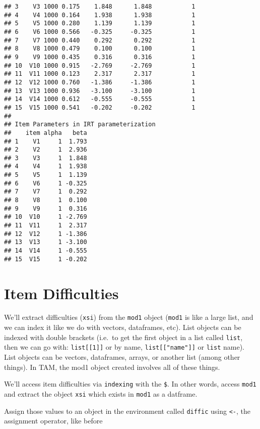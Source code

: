 \documentclass[
]{book}
\newenvironment{Shaded}{\begin{snugshade}}{\end{snugshade}}
\newcommand{\NormalTok}[1]{#1}
\newcommand{\OtherTok}[1]{\textcolor[rgb]{0.56,0.35,0.01}{#1}}
\newcommand{\SpecialCharTok}[1]{\textcolor[rgb]{0.00,0.00,0.00}{#1}}
\begin{document}
\begin{verbatim}
## 3    V3 1000 0.175    1.848      1.848           1
## 4    V4 1000 0.164    1.938      1.938           1
## 5    V5 1000 0.280    1.139      1.139           1
## 6    V6 1000 0.566   -0.325     -0.325           1
## 7    V7 1000 0.440    0.292      0.292           1
## 8    V8 1000 0.479    0.100      0.100           1
## 9    V9 1000 0.435    0.316      0.316           1
## 10  V10 1000 0.915   -2.769     -2.769           1
## 11  V11 1000 0.123    2.317      2.317           1
## 12  V12 1000 0.760   -1.386     -1.386           1
## 13  V13 1000 0.936   -3.100     -3.100           1
## 14  V14 1000 0.612   -0.555     -0.555           1
## 15  V15 1000 0.541   -0.202     -0.202           1
## 
## Item Parameters in IRT parameterization
##    item alpha   beta
## 1    V1     1  1.793
## 2    V2     1  2.936
## 3    V3     1  1.848
## 4    V4     1  1.938
## 5    V5     1  1.139
## 6    V6     1 -0.325
## 7    V7     1  0.292
## 8    V8     1  0.100
## 9    V9     1  0.316
## 10  V10     1 -2.769
## 11  V11     1  2.317
## 12  V12     1 -1.386
## 13  V13     1 -3.100
## 14  V14     1 -0.555
## 15  V15     1 -0.202
\end{verbatim}

\hypertarget{item-difficulties}{%
\section{Item Difficulties}\label{item-difficulties}}

We'll extract difficulties (\texttt{xsi}) from the \texttt{mod1} object (\texttt{mod1} is like a large list, and we can index it like we do with vectors, dataframes, etc). List objects can be indexed with double brackets (i.e.~to get the first object in a list called \texttt{list}, then we can go with: \texttt{list{[}{[}1{]}{]}} or by name, \texttt{list{[}{[}"name"{]}{]}} or \texttt{list} name). List objects can be vectors, dataframes, arrays, or another list (among other things). In TAM, the mod1 object created involves all of these things.

We'll access item difficulties via \texttt{indexing} with the \texttt{\$}. In other words, access \texttt{mod1} and extract the object \texttt{xsi} which exists in \texttt{mod1} as a datframe.

Assign those values to an object in the environment called \texttt{diffic} using \texttt{\textless{}-}, the assignment operator, like before

\begin{Shaded}
\end{Shaded}
\end{document}
